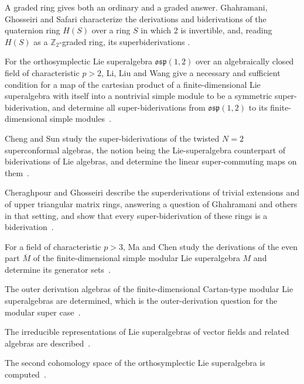 A graded ring gives both an ordinary and a graded answer. Ghahramani, Ghosseiri
and Safari characterize the derivations and biderivations of the quaternion ring
$H(S)$ over a ring $S$ in which 2 is invertible, and, reading $H(S)$ as a
$\mathbb{Z}_2$-graded ring, its superbiderivations
\cite[Abstract]{GhahramaniGhosseiriSafari2020}.

For the orthosymplectic Lie superalgebra $\mathfrak{osp}(1,2)$ over an algebraically closed field of characteristic $p>2$, Li, Liu and Wang give a necessary and sufficient condition for a map of the cartesian product of a finite-dimensional Lie superalgebra with itself into a nontrivial simple module to be a symmetric super-biderivation, and determine all super-biderivations from $\mathfrak{osp}(1,2)$ to its finite-dimensional simple modules~\cite{WlSuperBiderivationsFromOsp12ToA2025}.

Cheng and Sun study the super-biderivations of the twisted $N=2$ superconformal algebras, the notion being the Lie-superalgebra counterpart of biderivations of Lie algebras, and determine the linear super-commuting maps on them~\cite{WlSuperBiderivationsAndLinearSup2019}.

Cheraghpour and Ghosseiri describe the superderivations of trivial extensions and of upper triangular matrix rings, answering a question of Ghahramani and others in that setting, and show that every super-biderivation of these rings is a biderivation~\cite{WlOnSuperderivationsAndSuperBide2019}.

For a field of characteristic $p>3$, Ma and Chen study the derivations of the even part $\overline{M}$ of the finite-dimensional simple modular Lie superalgebra $M$ and determine its generator sets~\cite{WlDerivationsOfTheEvenPartOfFini2015}.

The outer derivation algebras of the finite-dimensional Cartan-type modular Lie superalgebras are determined, which is the outer-derivation question for the modular super case~\cite{WlTheOuterDerivationAlgebrasOfFi2020}.

The irreducible representations of Lie superalgebras of vector fields and related algebras are described~\cite{WlIrreducibleRepresentationsOfLi2020}.

The second cohomology space of the orthosymplectic Lie superalgebra is computed~\cite{WlSecondCohomologySpaceOfTheOrth2020}.
